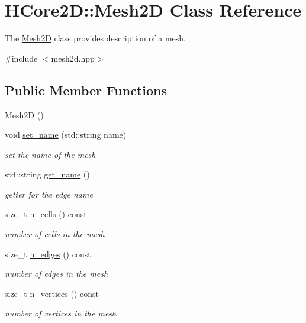 \hypertarget{classHCore2D_1_1Mesh2D}{}\section{H\+Core2D\+:\+:Mesh2D Class Reference}
\label{classHCore2D_1_1Mesh2D}


The \hyperlink{classHCore2D_1_1Mesh2D}{Mesh2D} class provides description of a mesh.  




{\ttfamily \#include $<$mesh2d.\+hpp$>$}

\subsection*{Public Member Functions}
\begin{DoxyCompactItemize}
\item 
\hyperlink{classHCore2D_1_1Mesh2D_a04b6cd67a13e59ec44be0b19739610e7}{Mesh2D} ()
\item 
void \hyperlink{group__Mesh2D_ga704527818bf03e51f78e11ac8d9eae7d}{set\+\_\+name} (std\+::string name)
\begin{DoxyCompactList}\small\item\em set the name of the mesh \end{DoxyCompactList}\item 
std\+::string \hyperlink{group__Mesh2D_ga372f45938f2cc055c5b82d8de5721726}{get\+\_\+name} ()
\begin{DoxyCompactList}\small\item\em getter for the edge name \end{DoxyCompactList}\item 
size\+\_\+t \hyperlink{group__Mesh2D_ga4406f804c0514eeb2e77380f0b9d9d2b}{n\+\_\+cells} () const
\begin{DoxyCompactList}\small\item\em number of cells in the mesh \end{DoxyCompactList}\item 
size\+\_\+t \hyperlink{group__Mesh2D_gae4b64fb6ee4558595fd012dc9365f353}{n\+\_\+edges} () const
\begin{DoxyCompactList}\small\item\em number of edges in the mesh \end{DoxyCompactList}\item 
size\+\_\+t \hyperlink{group__Mesh2D_ga21d940ec0948906fbb4560a0f791474f}{n\+\_\+vertices} () const
\begin{DoxyCompactList}\small\item\em number of vertices in the mesh \end{DoxyCompactList}\item 

\end{DoxyCompactItemize}
